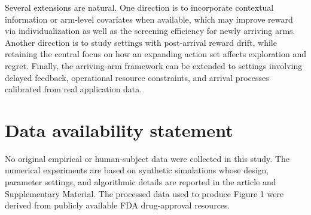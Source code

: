 \documentclass[
  12pt]{article}
\begin{document}
Several extensions are natural. One direction is to incorporate contextual information or arm-level covariates when  available, which may improve reward via individualization as well as the screening efficiency for newly arriving arms. Another direction is to study settings with post-arrival reward drift, while retaining the central focus on how an expanding action set affects exploration and regret. Finally, the arriving-arm framework can be extended to settings involving delayed feedback, operational resource constraints, and arrival processes calibrated from real application data.

\section*{Data availability statement}

No original empirical or human-subject data were collected in this study. The numerical experiments are based on synthetic simulations whose design, parameter settings, and algorithmic details are reported in the article and Supplementary Material. The processed data used to produce Figure 1 were derived from publicly available FDA drug-approval resources.




\printbibliography


\newpage

\label{supplementary-material}
\bigskip


\clearpage
\appendix

\setcounter{page}{1}
\renewcommand{\thepage}{S-\arabic{page}}

\end{document}
